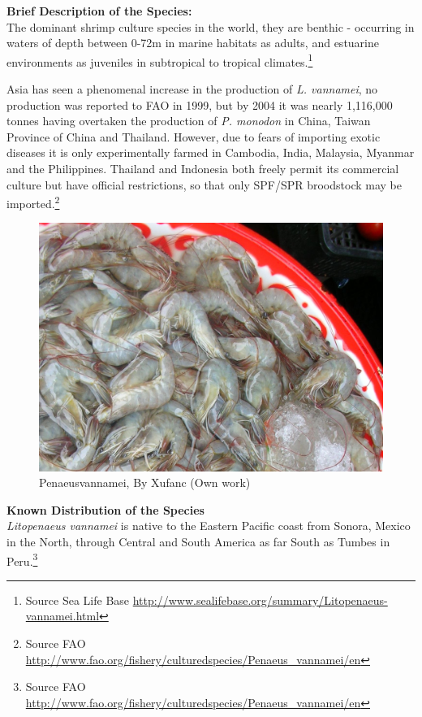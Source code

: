 \documentclass[]{book}
\theoremstyle{definition}
\theoremstyle{definition}
\theoremstyle{definition}
\theoremstyle{remark}
\begin{document}
\textbf{Brief Description of the Species:}\\
The dominant shrimp culture species in the world, they are benthic -
occurring in waters of depth between 0-72m in marine habitats as adults,
and estuarine environments as juveniles in subtropical to tropical
climates.\footnote{Source Sea Life Base
  \url{http://www.sealifebase.org/summary/Litopenaeus-vannamei.html}}

Asia has seen a phenomenal increase in the production of \emph{L.
vannamei}, no production was reported to FAO in 1999, but by 2004 it was
nearly 1,116,000 tonnes having overtaken the production of \emph{P.
monodon} in China, Taiwan Province of China and Thailand. However, due
to fears of importing exotic diseases it is only experimentally farmed
in Cambodia, India, Malaysia, Myanmar and the Philippines. Thailand and
Indonesia both freely permit its commercial culture but have official
restrictions, so that only SPF/SPR broodstock may be imported.\footnote{Source
  FAO
  \url{http://www.fao.org/fishery/culturedspecies/Penaeus_vannamei/en}}

\begin{figure}

{\centering \includegraphics[width=19.69in]{images_species/Litopenaeus_vannamei55} 

}

\caption{Penaeusvannamei, By Xufanc (Own work)}\label{fig:unnamed-chunk-4}
\end{figure}

\textbf{Known Distribution of the Species}\\
\emph{Litopenaeus vannamei} is native to the Eastern Pacific coast from
Sonora, Mexico in the North, through Central and South America as far
South as Tumbes in Peru.\footnote{Source FAO
  \url{http://www.fao.org/fishery/culturedspecies/Penaeus_vannamei/en}}
\end{document}
